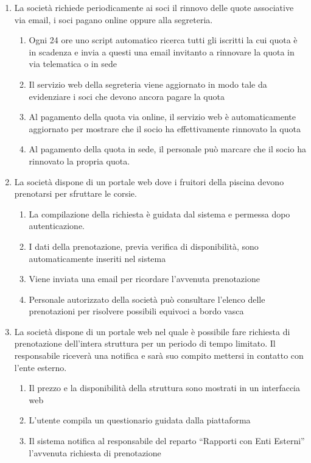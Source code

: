 \documentclass[11pt]{article} %
\begin{document}
\begin{enumerate}
	\item La società richiede periodicamente ai soci il rinnovo delle quote associative via email, i soci pagano online oppure alla segreteria.
	\begin{enumerate}
		\item Ogni 24 ore uno script automatico ricerca tutti gli iscritti la cui quota è in scadenza e invia a questi una email invitanto a rinnovare la quota in via telematica o in sede
		\item Il servizio web della segreteria viene aggiornato in modo tale da evidenziare i soci che devono ancora pagare la quota
		\item Al pagamento della quota via online, il servizio web è automaticamente aggiornato per mostrare che il socio ha effettivamente rinnovato la quota
		\item Al pagamento della quota in sede, il personale può marcare che il socio ha rinnovato la propria quota.
	\end{enumerate}

	\item La società dispone di un portale web dove i fruitori della piscina devono prenotarsi per sfruttare le corsie.
	\begin{enumerate}
		\item La compilazione della richiesta è guidata dal sistema e permessa dopo autenticazione.
		\item I dati della prenotazione, previa verifica di disponibilità, sono automaticamente inseriti nel sistema
		\item Viene inviata una email per ricordare l'avvenuta prenotazione
		\item Personale autorizzato della società può consultare l'elenco delle prenotazioni per risolvere possibili equivoci a bordo vasca
	\end{enumerate}
	\item La società dispone di un portale web nel quale è possibile fare richiesta di prenotazione dell'intera struttura per un periodo di tempo limitato. Il responsabile riceverà una notifica e sarà suo compito mettersi in contatto con l'ente esterno.
	\begin{enumerate}
		\item Il prezzo e la disponibilità della struttura sono mostrati in un interfaccia web
		\item L'utente compila un questionario guidata dalla piattaforma
		\item Il sistema notifica al responsabile del reparto ``Rapporti con Enti Esterni'' l'avvenuta richiesta di prenotazione
	\end{enumerate}
	

\end{enumerate}
\end{document}
